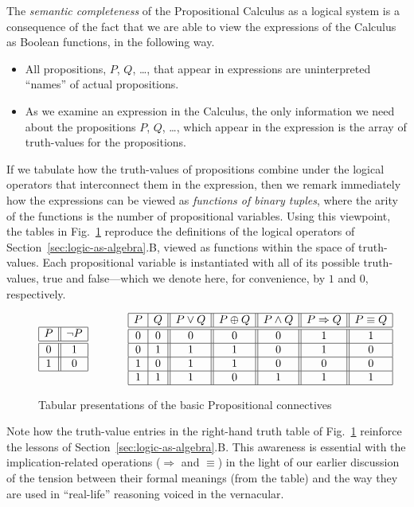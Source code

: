 The {\em semantic completeness} of the Propositional Calculus as a logical system is a consequence of the fact that we are able to view the expressions of the Calculus as Boolean functions, in the following way.
\begin{itemize}
\item
All propositions, $P$, $Q$, \ldots, that appear in expressions are uninterpreted ``names'' of actual propositions.
\medskip\item
As we examine an expression in the Calculus, the only information we need about the propositions $P$, $Q$, \ldots, which appear in the expression is the array of truth-values for the propositions.
\end{itemize}
If we tabulate how the truth-values of propositions combine under the logical operators that interconnect them in the expression, then we remark immediately how the expressions can be viewed as {\em functions of binary tuples}, where the arity of the functions is the number of propositional variables.  Using this viewpoint, the tables in Fig.~\ref{fig:defns-via-tables} reproduce the definitions of the logical operators of Section~\ref{sec:logic-as-algebra}.B, viewed as functions within the space of truth-values.  Each propositional variable is instantiated with all of its possible truth-values, {\sc true} and {\sc false}---which we denote here, for convenience, by $1$ and $0$, respectively.
\begin{figure}[hbt]
\[
\begin{array}{|c||c|}
\hline
P & \neg P \\
\hline
\hline
0 & 1 \\
\hline
1 & 0 \\
\hline
\end{array}
\hspace*{.5in}
\begin{array}{|c|c||c||c||c||c||c|}
\hline
P & Q & P \vee Q  & P \oplus Q & P \wedge Q & P \Rightarrow Q & P \equiv Q  \\
\hline
\hline
0 & 0 & 0 & 0 & 0 & 1 & 1 \\
\hline
0 & 1 & 1 & 1 & 0 & 1 & 0 \\
\hline
1 & 0 & 1 & 1 & 0 & 0 & 0 \\
\hline
1 & 1 & 1 & 0 & 1 & 1 & 1 \\
\hline
\end{array}
\]
\caption{Tabular presentations of the basic Propositional connectives
\label{fig:defns-via-tables}}
\end{figure}
Note how the truth-value entries in the right-hand truth table of Fig.~\ref{fig:defns-via-tables} reinforce the lessons of Section~\ref{sec:logic-as-algebra}.B.  This awareness is essential with the implication-related operations ($\Rightarrow$ and $\equiv$) in the light of our earlier discussion of the tension between their formal meanings (from the table) and the way they are
used in ``real-life'' reasoning voiced in the vernacular.


